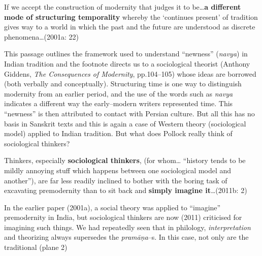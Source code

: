 {{\begin{myquote}
If we accept the construction of modernity that judges it to be…\textbf{a different mode of structuring temporality} whereby the ‘continues present’ of tradition gives way to a world in which the past and the future are understood as discrete phenomena…(2001a: 22)
\end{myquote}

This passage outlines the framework used to understand “newness” (\textit{navya}) in Indian tradition and the footnote directs us to a sociological theorist (Anthony Giddens, \textit{The Consequences of Modernity}, pp.104–105) whose ideas are borrowed (both verbally and conceptually). Structuring time is one way to distinguish modernity from an earlier period, and the use of the words such as \textit{navya }indicates a different way the early–modern writers represented time. This “newness” is then attributed to contact with Persian culture. But all this has no basis in Sanskrit texts and this is again a case of Western theory (sociological model) applied to Indian tradition. But what does Pollock really think of sociological thinkers?

\newpage

\begin{myquote}
Thinkers, especially \textbf{sociological thinkers}, (for whom… “history tends to be mildly annoying stuff which happens between one sociological model and another”), are far less readily inclined to bother with the boring task of excavating premodernity than to sit back and \textbf{simply imagine it}…(2011b: 2)
\end{myquote}

In the earlier paper (2001a), a social theory was applied to “imagine” premodernity in India, but sociological thinkers are now (2011) criticised for imagining such things. We had repeatedly seen that in philology, \textit{interpretation} and theorizing always supersedes the \textit{pramāṇa}–s. In this case, not only are the traditional (plane 2)}}
